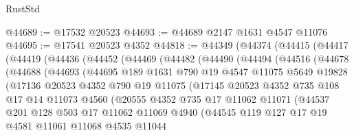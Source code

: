 \begin{lexlean}{RustStd}
\begin{coremodule}
@44689 := @17532 @20523
@44693 := @44689 @2147 @1631 @4547 @11076
@44695 := @17541 @20523 @4352
@44818 := @44349
    (@44374
      (@44415
        (@44417
          (@44419
            (@44436
              (@44452
                (@44469
                  (@44482
                    (@44490
                      (@44494
                        (@44516
                          (@44678
                            (@44688
                              (@44693
                                (@44695
                                  @189
                                  @1631
                                  @790
                                  @19
                                  @4547
                                  @11075
                                  @5649
                                  @19828
                                  (@17136
                                    @20523
                                    @4352
                                    @790
                                    @19
                                    @11075
                                    (@17145
                                      @20523
                                      @4352
                                      @735
                                      @108
                                      @17
                                      @14
                                      @11073
                                      @4560
                                      (@20555
                                        @4352
                                        @735
                                        @17
                                        @11062
                                        @11071
                                        (@44537
                                          @201
                                          @128
                                          @503
                                          @17
                                          @11062
                                          @11069
                                          @4940
                                          (@44545
                                            @119
                                            @127
                                            @17
                                            @19
                                            @4581
                                            @11061
                                            @11068
                                            @4535
                                            @11044

\end{coremodule}
\end{lexlean}
